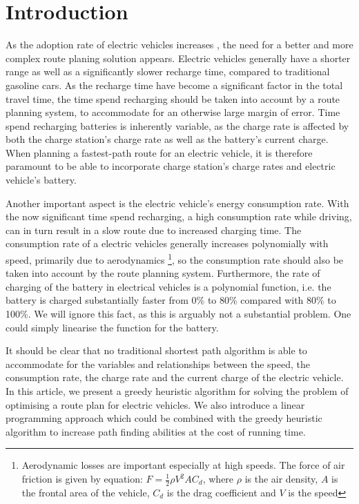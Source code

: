 \section{Introduction}

As the adoption rate of electric vehicles increases \cite{Henry2013}, the need for a better and more complex route planing solution appears. Electric vehicles generally have a shorter range as well as a significantly slower recharge time, compared to traditional gasoline cars. As the recharge time have become a significant factor in the total travel time, the time spend recharging should be taken into account by a route planning system, to accommodate for an otherwise large margin of error. Time spend recharging batteries is inherently variable, as the charge rate is affected by both the charge station's charge rate as well as the battery's current charge. When planning a fastest-path route for an electric vehicle, it is therefore paramount to be able to incorporate charge station's charge rates and electric vehicle's battery.

Another important aspect is the electric vehicle's energy consumption rate. With the now significant time spend recharging, a high consumption rate while driving, can in turn result in a slow route due to increased charging time. The consumption rate of a electric vehicles generally increases polynomially with speed, primarily due to aerodynamics \footnote{Aerodynamic losses are important especially at high speeds. The force of air friction is given by equation: $F = \frac{1}{2} \rho V^2 A C_d$, where $\rho$ is the air density, $A$ is the frontal area of the vehicle, $C_d$ is the drag coefficient and $V$ is the speed}, so the consumption rate should also be taken into account by the route planning system. Furthermore, the rate of charging of the battery in electrical vehicles is a polynomial function, i.e. the battery is charged substantially faster from 0\% to 80\% compared with 80\% to 100\%. We will ignore this fact, as this is arguably not a substantial problem. One could simply linearise the function for the battery.

It should be clear that no traditional shortest path algorithm is able to accommodate for the variables and relationships between the speed, the consumption rate, the charge rate and the current charge of the electric vehicle. In this article, we present a greedy heuristic algorithm for solving the problem of optimising a route plan for electric vehicles. We also introduce a linear programming approach which could be combined with the greedy heuristic algorithm to increase path finding abilities at the cost of running time.  




